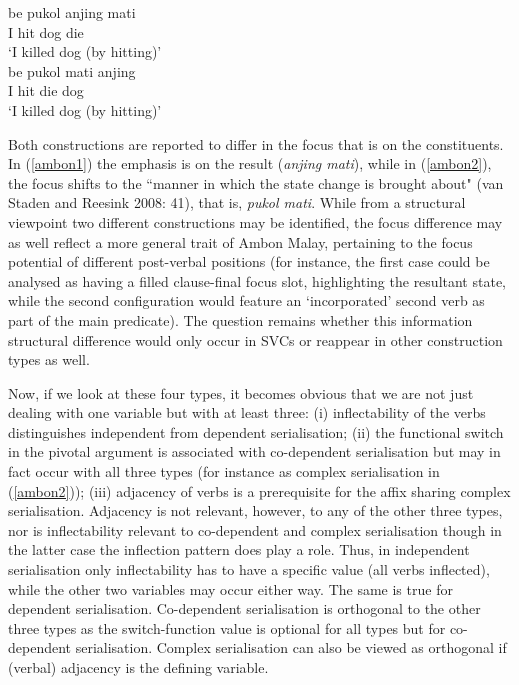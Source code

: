 \pex \label{ambon}
\a \label{ambon1}
\gll be pukol anjing mati \\
I hit dog die \\
\glft `I killed dog (by hitting)' \\ 
\z
\a \label{ambon2}
\gla be pukol mati anjing \\ 
I hit die dog \\
\glft `I killed dog (by hitting)' \\ 
\z
\xe

Both constructions are reported to differ in the focus that is on the constituents. In (\ref{ambon1}) the emphasis is on the result (\textit{anjing mati}), while in (\ref{ambon2}), the focus shifts to the ``manner in which the state change is brought about" (van Staden and Reesink 2008: 41), that is, \textit{pukol mati}. While from a structural viewpoint two different constructions may be identified, the focus difference may as well reflect a more general trait of Ambon Malay, pertaining to the focus potential of different post-verbal positions (for instance, the first case could be analysed as having a filled clause-final focus slot, highlighting the resultant state, while the second configuration would feature an `incorporated' second verb as part of the main predicate). The question remains whether this information structural difference would only occur in SVCs or reappear in other construction types as well.

Now, if we look at these four types, it becomes obvious that we are not just dealing with one variable but with at least three: (i) inflectability of the verbs distinguishes independent from dependent serialisation; (ii) the functional switch in the pivotal argument is associated with co-dependent serialisation but may in fact occur with all three types (for instance as complex serialisation in (\ref{ambon2})); (iii) adjacency of verbs is a prerequisite for the affix sharing complex serialisation. Adjacency is not relevant, however, to any of the other three types, nor is inflectability relevant to co-dependent and complex serialisation though in the latter case the inflection pattern does play a role. Thus, in independent serialisation only inflectability has to have a specific value (all verbs inflected), while the other two variables may occur either way. The same is true for dependent serialisation. Co-dependent serialisation is orthogonal to the other three types as the switch-function value is optional for all types but for co-dependent serialisation. Complex serialisation can also be viewed as orthogonal if (verbal) adjacency is the defining variable. 

